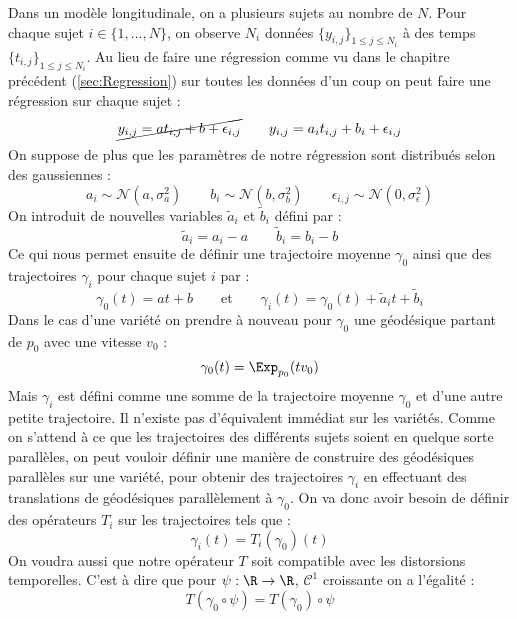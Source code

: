 Dans un modèle longitudinale, on a plusieurs sujets au nombre de $N$. Pour chaque sujet $i \in \{ 1, ..., N \}$, on observe $N_i$ données $\{ y_{i,j} \}_{1 \leqslant j \leqslant N_i}$ à des temps $\{ t_{i,j} \}_{1 \leqslant j \leqslant N_i}$. Au lieu de faire une régression comme vu dans le chapitre précédent (\ref{sec:Regression}) sur toutes les données d'un coup on peut faire une régression sur chaque sujet :
\begin{equation}
	\cancel{y_{i,j} = a t_{i,j} + b + \epsilon_{i,j}} \qquad y_{i,j} = a_i t_{i,j} + b_i + \epsilon_{i,j}
\end{equation}
On suppose de plus que les paramètres de notre régression sont distribués selon des gaussiennes :
\begin{equation}
	a_i \sim \mathcal{N}(a, \sigma_a^2) \qquad b_i \sim \mathcal{N}(b, \sigma_b^2) \qquad \epsilon_{i,j} \sim \mathcal{N}(0, \sigma_\epsilon^2)
\end{equation}
On introduit de nouvelles variables $\tilde{a}_i$ et $\tilde{b}_i$ défini par :
\begin{equation}
	\tilde{a}_i = a_i - a \qquad \tilde{b}_i = b_i - b
\end{equation}
Ce qui nous permet ensuite de définir une trajectoire moyenne $\gamma_0$ ainsi que des trajectoires $\gamma_i$ pour chaque sujet $i$ par :
\begin{equation}
	\gamma_0(t) = at + b \qquad \text{et} \qquad \gamma_i(t) = \gamma_0(t) + \tilde{a}_it + \tilde{b}_i
\end{equation}
Dans le cas d'une variété on prendre à nouveau pour $\gamma_0$ une géodésique partant de $p_0$ avec une vitesse $v_0$ :
\begin{equation}
	\gamma_0(t) = \Exp_{p_0}(t v_0)
\end{equation}
Mais $\gamma_i$ est défini comme une somme de la trajectoire moyenne $\gamma_0$ et d'une autre petite trajectoire. Il n'existe pas d'équivalent immédiat sur les variétés. Comme on s'attend à ce que les trajectoires des différents sujets soient en quelque sorte parallèles, on peut vouloir définir une manière de construire des géodésiques parallèles sur une variété, pour obtenir des trajectoires $\gamma_i$ en effectuant des translations de géodésiques parallèlement à $\gamma_0$. On va donc avoir besoin de définir des opérateurs $T_i$ sur les trajectoires tels que :
\begin{equation}
	\gamma_i(t) = T_i(\gamma_0)(t)
\end{equation}
On voudra aussi que notre opérateur $T$ soit compatible avec les distorsions temporelles. C'est à dire que pour $\psi : \R \rightarrow \R$, $\mathcal{C}^1$ croissante on a l'égalité :
\begin{equation}
	T(\gamma_0 \circ \psi) = T(\gamma_0) \circ \psi
\end{equation} 

